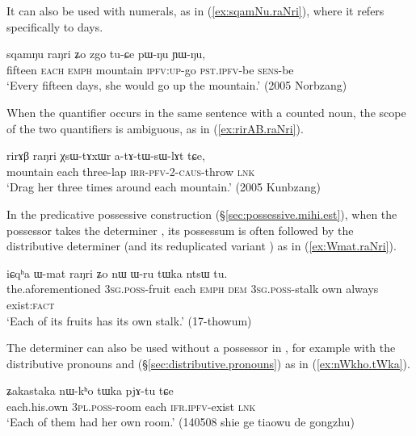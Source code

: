  It can also be used with numerals, as in (\ref{ex:sqamNu.raNri}), where it refers specifically to days.

 \begin{exe}
\ex \label{ex:sqamNu.raNri}
\gll  sqamŋu raŋri ʑo zgo tu-ɕe pɯ-ŋu ɲɯ-ŋu, \\
fifteen \textsc{each} \textsc{emph} mountain \textsc{ipfv}:\textsc{up}-go \textsc{pst}.\textsc{ipfv}-be \textsc{sens}-be \\
\glt `Every fifteen days, she would go up the mountain.' (2005 Norbzang)
  \end{exe}

When the quantifier  occurs in the same sentence with a counted noun, the scope of the two quantifiers is ambiguous, as in (\ref{ex:rirAB.raNri}).

\begin{exe}
\ex \label{ex:rirAB.raNri}
\gll rirɤβ raŋri χsɯ-tɤxɯr a-tɤ-tɯ-sɯ-lɤt tɕe, \\
mountain each three-lap \textsc{irr}-\textsc{pfv}-2-\textsc{caus}-throw \textsc{lnk} \\
\glt `Drag her three times around each mountain.' (2005 Kunbzang)
 \end{exe}
 
In the predicative possessive construction (§\ref{sec:possessive.mihi.est}), when the possessor takes the determiner , its possessum is often  followed by the distributive determiner  (and its reduplicated variant ) as in (\ref{ex:Wmat.raNri}).
 
  \begin{exe}
\ex \label{ex:Wmat.raNri}
\gll   iɕqʰa ɯ-mat raŋri ʑo nɯ ɯ-ru tɯka ntsɯ tu. \\
the.aforementioned \textsc{3sg}.\textsc{poss}-fruit each \textsc{emph} \textsc{dem} \textsc{3sg}.\textsc{poss}-stalk own always exist:\textsc{fact} \\
\glt `Each of its fruits has its own stalk.' (17-thowum)
  \end{exe}
  
The  determiner  can also be used without a possessor in , for example with the distributive pronouns  and  (§\ref{sec:distributive.pronouns})  as in (\ref{ex:nWkho.tWka}).

   \begin{exe}
\ex \label{ex:nWkho.tWka}
\gll   ʑakastaka nɯ-kʰo tɯka pjɤ-tu tɕe \\
each.his.own \textsc{3pl}.\textsc{poss}-room each \textsc{ifr}.\textsc{ipfv}-exist \textsc{lnk} \\
\glt `Each of them had her own room.' (140508 shie ge tiaowu de gongzhu)
   \end{exe}
   
